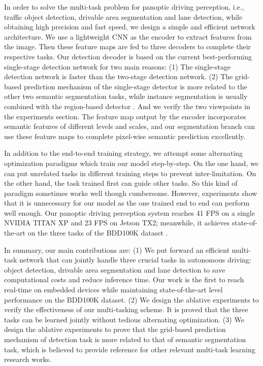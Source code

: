 \documentclass[10pt,twocolumn,letterpaper]{article}
\begin{document}
In order to solve the multi-task problem for panoptic driving perception, i.e., traffic object detection, drivable area segmentation and lane detection, while obtaining high precision and fast speed, we design a simple and efficient network architecture. We use a lightweight CNN \cite{cspdarknet} as the encoder to extract features from the image. Then these feature maps are fed to three decoders to complete their respective tasks. Our detection decoder is based on the current best-performing single-stage detection network \cite{yolov4} for two main reasons: (1) The single-stage detection network is faster than the two-stage detection network. (2) The grid-based prediction mechanism of the single-stage detector is more related to the other two semantic segmentation tasks, while instance segmentation is usually combined with the region-based detector \cite{mask-rcnn}. And we verify the two viewpoints in the  experiments section. The feature map output by the encoder incorporates semantic features of different levels and scales, and our segmentation branch can use these feature maps to complete pixel-wise semantic prediction excellently.

In addition to the end-to-end training strategy, we attempt some alternating optimization paradigms which train our model step-by-step. On the one hand, we can put unrelated tasks in different training steps to prevent inter-limitation. On the other hand, the task trained first can guide other tasks. So this kind of paradigm sometimes works well though cumbersome. However, experiments show that it is unnecessary for our model as the one trained end to end can perform well enough. Our panoptic driving perception system reaches 41 FPS on a single NVIDIA TITAN XP and 23 FPS on Jetson TX2; meanwhile, it achieves state-of-the-art on the three tasks of the BDD100K dataset \cite{bdd100k}.

In summary, our main contributions are: 
(1) We put forward an efficient multi-task network that can jointly handle three crucial tasks in autonomous driving: object detection, drivable area segmentation and lane detection to save computational costs and reduce inference time. Our work is the first to reach real-time on embedded devices while maintaining state-of-the-art level performance on the BDD100K dataset.
(2) We design the ablative experiments to verify the effectiveness of our multi-tasking scheme. It is proved that the three tasks can be learned jointly without tedious alternating optimization.
(3) We design the ablative experiments to prove that the grid-based prediction mechanism of detection task is more related to that of semantic segmentation task, which is believed to provide reference for other relevant multi-task learning research works.
\end{document}
